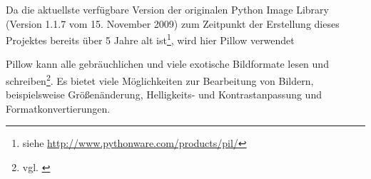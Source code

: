 Da die aktuellste verfügbare Version der originalen Python Image Library (Version 1.1.7 vom 15. November 2009) zum Zeitpunkt der Erstellung dieses Projektes bereits über 5 Jahre alt ist\footnote{siehe \url{http://www.pythonware.com/products/pil/}}, wird hier Pillow verwendet

Pillow kann alle gebräuchlichen und viele exotische Bildformate lesen und schreiben\footnote{vgl. \citet{pillowdoc}}. Es bietet viele Möglichkeiten zur Bearbeitung von Bildern, beispielsweise Größenänderung, Helligkeits- und Kontrastanpassung und Formatkonvertierungen.